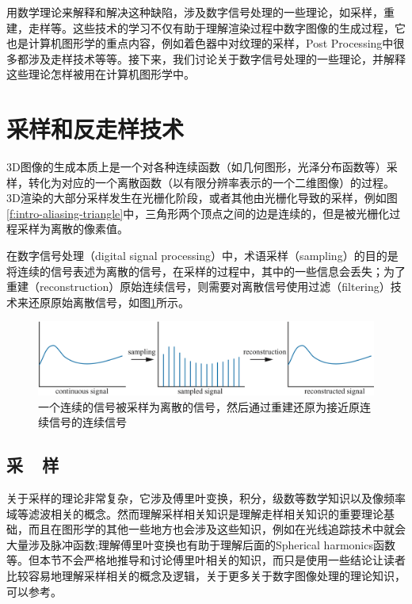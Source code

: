 用数学理论来解释和解决这种缺陷，涉及数字信号处理的一些理论，如采样，重建，走样等。这些技术的学习不仅有助于理解渲染过程中数字图像的生成过程，它也是计算机图形学的重点内容，例如着色器中对纹理的采样，Post Processing中很多都涉及走样技术等等。接下来，我们讨论关于数字信号处理的一些理论，并解释这些理论怎样被用在计算机图形学中。







\section{采样和反走样技术}\label{sec:intro-sampling}
3D图像的生成本质上是一个对各种连续函数（如几何图形，光泽分布函数等）采样，转化为对应的一个离散函数（以有限分辨率表示的一个二维图像）的过程。3D渲染的大部分采样发生在光栅化阶段，或者其他由光栅化导致的采样，例如图\ref{f:intro-aliasing-triangle}中，三角形两个顶点之间的边是连续的，但是被光栅化过程采样为离散的像素值。

在数字信号处理（digital signal processing）中，术语采样（sampling）的目的是将连续的信号表述为离散的信号，在采样的过程中，其中的一些信息会丢失；为了重建（reconstruction）原始连续信号，则需要对离散信号使用过滤（filtering）技术来还原原始离散信号，如图\ref{f:intro-signal-processing}所示。

\begin{figure}
\begin{fullwidth}
	\includegraphics[width=1.\thewidth]{figures/intro/signal-processing}
	\caption{一个连续的信号被采样为离散的信号，然后通过重建还原为接近原连续信号的连续信号}
\end{fullwidth}
\label{f:intro-signal-processing}
\end{figure}


\subsection{采~~样}\label{sec:intro-sampling}
关于采样的理论非常复杂，它涉及傅里叶变换，积分，级数等数学知识以及像频率域等滤波相关的概念。然而理解采样相关知识是理解走样相关知识的重要理论基础，而且在图形学的其他一些地方也会涉及这些知识，例如在光线追踪技术中就会大量涉及脉冲函数;理解傅里叶变换也有助于理解后面的Spherical harmonics函数等。但本节不会严格地推导和讨论傅里叶相关的知识，而只是使用一些结论让读者比较容易地理解采样相关的概念及逻辑，关于更多关于数字图像处理的理论知识，可以参考\cite{b:DigitalImageProcessing}。



